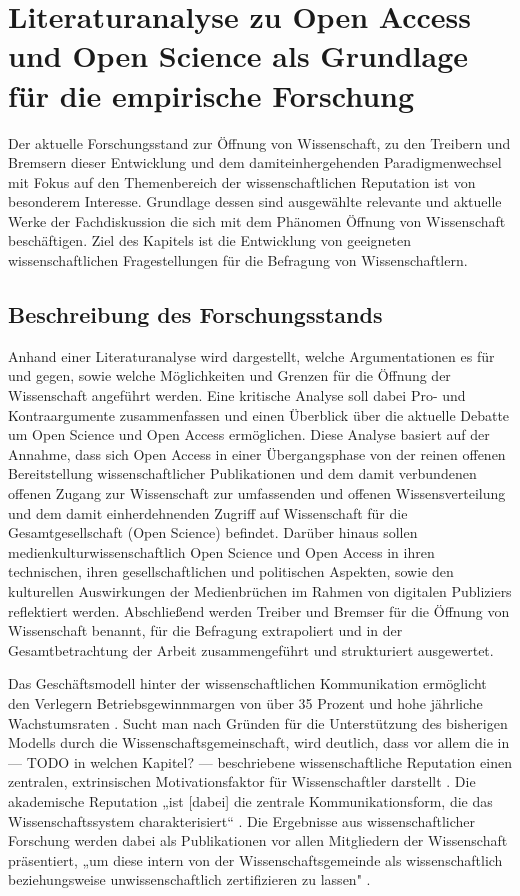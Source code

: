 \chapter{Literaturanalyse zu Open Access und Open Science als Grundlage für die empirische Forschung}
Der aktuelle Forschungsstand zur Öffnung von Wissenschaft, zu den Treibern und Bremsern dieser Entwicklung und dem damiteinhergehenden Paradigmenwechsel mit Fokus auf den Themenbereich der wissenschaftlichen Reputation ist von besonderem Interesse. Grundlage dessen sind ausgewählte relevante und aktuelle Werke der Fachdiskussion die sich mit dem Phänomen Öffnung von Wissenschaft beschäftigen. Ziel des Kapitels ist die Entwicklung von geeigneten wissenschaftlichen Fragestellungen für die Befragung von Wissenschaftlern.

\section{Beschreibung des Forschungsstands}
Anhand einer Literaturanalyse wird dargestellt, welche Argumentationen es für und gegen, sowie welche Möglichkeiten und Grenzen für die Öffnung der Wissenschaft angeführt werden. Eine kritische Analyse soll dabei Pro- und Kontraargumente zusammenfassen und einen Überblick über die aktuelle Debatte um Open Science und Open Access ermöglichen. Diese Analyse basiert auf der Annahme, dass sich Open Access in einer Übergangsphase von der reinen offenen Bereitstellung wissenschaftlicher Publikationen und dem damit verbundenen offenen Zugang zur Wissenschaft zur umfassenden und offenen Wissensverteilung und dem damit einherdehnenden Zugriff auf Wissenschaft für die Gesamtgesellschaft (Open Science) befindet. Darüber hinaus sollen medienkulturwissenschaftlich Open Science und Open Access in ihren technischen, ihren gesellschaftlichen und politischen Aspekten, sowie den kulturellen Auswirkungen der Medienbrüchen im Rahmen von digitalen Publiziers reflektiert werden. Abschließend werden Treiber und Bremser für die Öffnung von Wissenschaft benannt, für die Befragung extrapoliert und in der Gesamtbetrachtung der Arbeit zusammengeführt und strukturiert ausgewertet.

Das Geschäftsmodell hinter der wissenschaftlichen Kommunikation ermöglicht den Verlegern Betriebsgewinnmargen von über 35 Prozent \cite{russell_2008_business} und hohe jährliche Wachstumsraten \cite{Wellcome_Trust_2003}. Sucht man nach Gründen für die Unterstützung des bisherigen Modells durch die Wissenschaftsgemeinschaft, wird deutlich, dass vor allem die in --- TODO in welchen Kapitel? --- beschriebene wissenschaftliche Reputation einen zentralen, extrinsischen Motivationsfaktor für Wissenschaftler darstellt \cite{minssen_2012_arbeit}. Die akademische Reputation „ist [dabei] die zentrale Kommunikationsform, die das Wissenschaftssystem charakterisiert“ \cite{Rutenfranz_1997}. Die Ergebnisse aus wissenschaftlicher Forschung werden dabei als Publikationen vor allen Mitgliedern der Wissenschaft präsentiert, „um diese intern von der Wissenschaftsgemeinde als wissenschaftlich beziehungsweise unwissenschaftlich zertifizieren zu lassen" \cite{Rutenfranz_1997}. 


